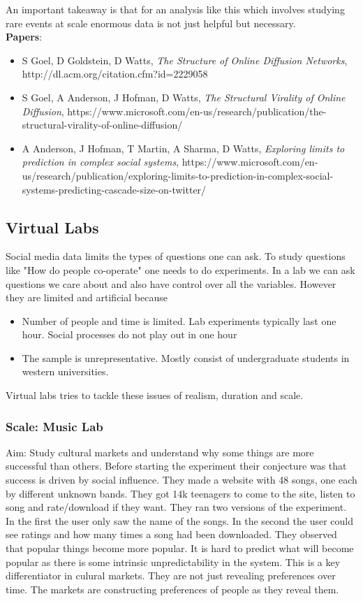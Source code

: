  An important takeaway is that for an analysis like this which involves studying rare events at scale enormous data is not just helpful but necessary.\\
 
 \textbf{Papers}:
  \begin{itemize}
  	\item S Goel, D Goldstein, D Watts, \textit{The Structure of Online Diffusion Networks}, http://dl.acm.org/citation.cfm?id=2229058
  	\item S Goel, A Anderson, J Hofman, D Watts, \textit{The Structural Virality of Online Diffusion}, https://www.microsoft.com/en-us/research/publication/the-structural-virality-of-online-diffusion/
  	\item A Anderson, J Hofman, T Martin, A Sharma, D Watts, \textit{Exploring limits to prediction in complex social systems}, https://www.microsoft.com/en-us/research/publication/exploring-limits-to-prediction-in-complex-social-systems-predicting-cascade-size-on-twitter/

  \end{itemize}

 
 
 
\subsection{Virtual Labs}
Social media data limits the types of questions one can ask. To study questions like "How do people co-operate" one needs to do experiments. In a lab we can ask questions we care about and also have control over all the variables. However they are limited and artificial because
  \begin{itemize}
  	\item Number of people and time is limited. Lab experiments typically last one hour. Social processes do not play out in one hour
  	\item The sample is unrepresentative. Mostly consist of undergraduate students in western universities.
  \end{itemize}

Virtual labs tries to tackle these issues of realism, duration and scale.

\subsubsection{Scale: Music Lab}
Aim: Study cultural markets and understand why some things are more successful than others. Before starting the experiment their conjecture was that success is driven by social influence. 
They made a website with 48 songs, one each by different unknown bands. They got 14k teenagers to come to the site, listen to song and rate/download if they want. They ran two versions of the experiment. In the first the user only saw the name of the songs. In the second the user could see ratings and how many times a song had been downloaded. They observed that popular things become more popular. It is hard to predict what will become popular as there is some intrinsic unpredictability in the system. This is a key differentiator in culural markets. They are not just revealing preferences over time. The markets are constructing preferences of people as they reveal them.

